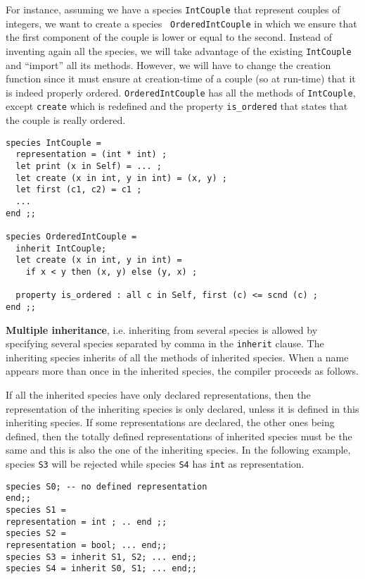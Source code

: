 For instance, assuming we have a species {\tt IntCouple} that
represent couples of integers, we want to create a species {\tt
OrderedIntCouple} in which we ensure that the first component of the
couple is lower or equal to the second. Instead of inventing again all
the species, we will take advantage of the existing {\tt IntCouple}
and ``import'' all its methods. However, we will have to change the
creation function since it must ensure at creation-time of a couple
(so at run-time) that it is indeed properly ordered.
{\tt OrderedIntCouple} has all the methods of {\tt IntCouple}, except
{\tt create} which is redefined and the property {\tt is\_ordered} that
states that the couple is really ordered.

{\scriptsize
\begin{lstlisting}
species IntCouple =
  representation = (int * int) ;
  let print (x in Self) = ... ;
  let create (x in int, y in int) = (x, y) ;
  let first (c1, c2) = c1 ;
  ...
end ;;

species OrderedIntCouple =
  inherit IntCouple;
  let create (x in int, y in int) =
    if x < y then (x, y) else (y, x) ;

  property is_ordered : all c in Self, first (c) <= scnd (c) ;
end ;;
\end{lstlisting}
}




\smallskip
{}
{\bf Multiple inheritance}, i.e. inheriting from several species is
allowed by specifying several species separated by comma in the
{\tt inherit} clause. The inheriting species inherits of all the
methods of inherited species. When a name appears more than once
in the inherited species, the compiler proceeds as follows.

If all the inherited species have only declared representations, then
the representation of the inheriting species is only declared, unless
it is defined in this inheriting species. If some representations are
declared, the other ones being defined, then the totally defined
representations of inherited species must be the same and this is also
the one of the inheriting species. In the following example, species
{\tt S3} will be rejected while species {\tt S4} has {\tt int} as
representation.

{\scriptsize
\begin{lstlisting}
species S0; -- no defined representation
end;;
species S1 =
representation = int ; .. end ;;
species S2 =
representation = bool; ... end;;
species S3 = inherit S1, S2; ... end;;
species S4 = inherit S0, S1; ... end;;
\end{lstlisting}
}

